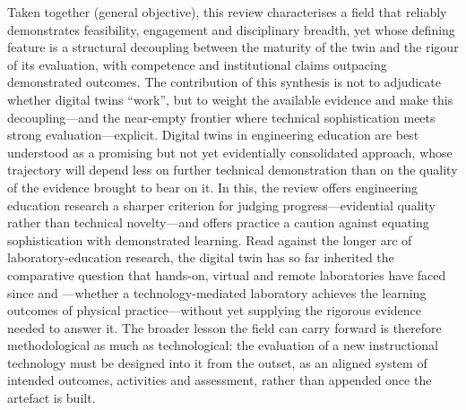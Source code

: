 Taken together (general objective), this review characterises a field that
reliably demonstrates feasibility, engagement and disciplinary breadth, yet whose
defining feature is a structural decoupling between the maturity of the twin and
the rigour of its evaluation, with competence and institutional claims outpacing
demonstrated outcomes. The contribution of this synthesis is not to adjudicate
whether digital twins ``work'', but to weight the available evidence and make this
decoupling---and the near-empty frontier where technical sophistication meets strong
evaluation---explicit. Digital twins in engineering education are best understood as
a promising but not yet evidentially consolidated approach, whose trajectory will
depend less on further technical demonstration than on the quality of the evidence
brought to bear on it. In this, the review offers engineering education research a
sharper criterion for judging progress---evidential quality rather than technical
novelty---and offers practice a caution against equating sophistication with
demonstrated learning. Read against the longer arc of laboratory-education
research, the digital twin has so far inherited the comparative question that
hands-on, virtual and remote laboratories have faced since \cite{ma_handson_2006} and
\cite{brinson_learning_2015}---whether a technology-mediated laboratory achieves the
learning outcomes of physical practice---without yet supplying the rigorous evidence
needed to answer it. The broader lesson the field can carry forward is therefore
methodological as much as technological: the evaluation of a new instructional
technology must be designed into it from the outset, as an aligned system of
intended outcomes, activities and assessment, rather than appended once the
artefact is built.

